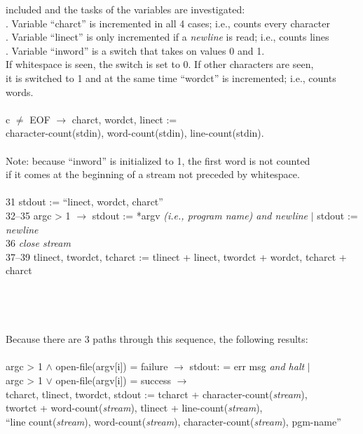 \begin{tabbing}
	\> included and the tasks of the variables are investigated:\\
	. Variable ``charct'' is incremented in all 4 cases; i.e., counts every character\\
	. Variable ``linect'' is only incremented if a {\em newline} is read; i.e., counts lines\\
	. Variable ``inword'' is a switch that takes on values 0 and 1.\\
	\> If whitespace is seen, the switch is set to 0. If other characters are seen,\\
	\> it is switched to 1 and at the same time ``wordct'' is incremented; i.e., counts words.\\
\\
	\> c $\not=$ EOF $\rightarrow$ 	charct, wordct, linect :=	\\
	\> \> character-count(stdin), word-count(stdin), line-count(stdin).\\
\\
	\> Note: because ``inword'' is initialized to 1, the first word is not counted\\
	\> if it comes at the beginning of a stream not preceded by whitespace.\\
\\
31	\> stdout := ``linect, wordct, charct''\\
32--35	\> argc > 1 $\rightarrow$ stdout := *argv {\em (i.e., program name) and newline} $\mid$ stdout := {\em newline}\\
36	\> {\em close stream}\\
37--39	\> tlinect, twordct, tcharct := tlinect + linect, twordct + wordct, tcharct + charct\\
\\
\\
\\
\\
	\> Because there are 3 paths through this sequence, the following results:\\
\\
	\> argc > 1 $\wedge$ open-file(argv[i]) = failure $\rightarrow$ stdout: = err msg {\em and halt} $\mid$\\
	\> argc > 1 $\vee$   open-file(argv[i]) = success $\rightarrow$\\
	\> \>	tcharct, tlinect, twordct, stdout := tcharct + character-count({\em stream}),\\
	\> \>	twortct + word-count({\em stream}), tlinect + line-count({\em stream}),\\
	\> \>   ``line count({\em stream}), word-count({\em stream}), character-count({\em stream}), pgm-name''\\

\end{tabbing}
